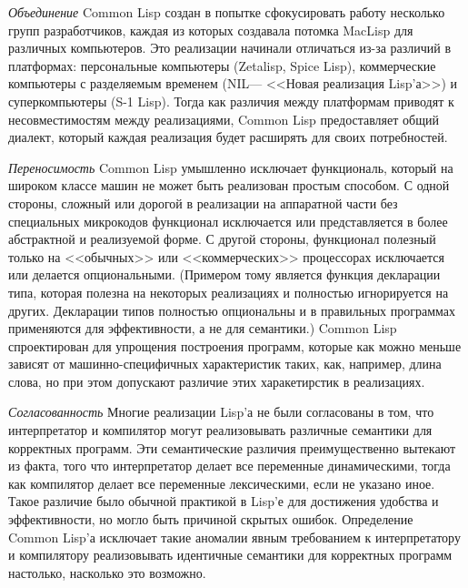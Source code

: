 \begin{flushdesc}
\item[\emph{Объединение}]
Common Lisp создан в попытке сфокусировать работу несколько групп
разработчиков, каждая из которых создавала потомка MacLisp для
различных компьютеров. Это реализации начинали отличаться из-за различий в
платформах: персональные компьютеры (Zetalisp, 
Spice Lisp), коммерческие компьютеры с разделяемым временем
(NIL--- <<Новая реализация Lisp'а>>) и суперкомпьютеры (S-1
Lisp). Тогда как различия между платформам приводят к несовместимостям
между реализациями, Common Lisp предоставляет общий диалект,
который каждая реализация будет расширять для своих потребностей.

\item[\emph{Переносимость}]
\begingroup{}
Common Lisp умышленно исключает функциональ, который на широком классе машин не
может быть реализован простым способом. С одной
стороны, сложный или дорогой в реализации на аппаратной части без специальных
микрокодов функционал исключается или
представляется в более абстрактной и реализуемой форме.
С другой стороны, функционал полезный только на
<<обычных>> или <<коммерческих>> процессорах исключается или
делается опциональными. (Примером тому является функция декларации
типа, которая полезна на некоторых реализациях и полностью
игнорируется на других. Декларации типов полностью опциональны и
в правильных программах применяются для эффективности, а не для семантики.)
Common Lisp спроектирован для упрощения построения программ,
которые как можно меньше зависят от машинно-специфичных
характеристик таких, как, например, длина слова, но при этом
допускают различие этих харакетирстик в реализациях.
\par\endgroup

\item[\emph{Согласованность}]
Многие реализации Lisp'а не были согласованы в том, что
интерпретатор и компилятор могут реализовывать различные
семантики для корректных программ.
Эти семантические различия преимущественно вытекают из факта, того
что интерпретатор делает все переменные динамическими, тогда как
компилятор делает все переменные лексическими, если не указано
иное. Такое различие было обычной практикой в Lisp'е для
достижения удобства и эффективности, но могло быть причиной скрытых
ошибок. Определение Common Lisp'а исключает такие аномалии явным
требованием к интерпретатору и компилятору реализовывать
идентичные семантики для корректных программ настолько, насколько
это возможно.


\end{flushdesc}

